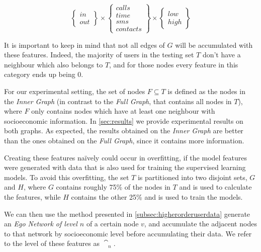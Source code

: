 \begin{equation}
\begin{Bmatrix} in \\ out \end{Bmatrix}
\times
\begin{Bmatrix} calls \\ time \\ sms \\ contacts \end{Bmatrix}
\times
\begin{Bmatrix} low \\ high \end{Bmatrix}
\label{eq:matcatuserdata}
\end{equation}

It is important to keep in mind that not all edges of $G$ will be accumulated with these features. Indeed, the majority of users in the testing set $T$ don't have a neighbour which also belongs to $T$, and for those nodes every feature in this category ends up being $0$.

For our experimental setting, the set of nodes $F \subseteq T$ is defined as the nodes in the \emph{Inner Graph} (in contrast to the \emph{Full Graph}, that contains all nodes in $T$), where $F$ only contains nodes which have at least one neighbour with socioeconomic information. In \cref{sec:results} we provide experimental results on both graphs. As expected, the results obtained on the \emph{Inner Graph} are better than the ones obtained on the \emph{Full Graph}, since it contains more information.

Creating these features naïvely could occur in overfitting, if the model features were generated with data that is also used for training the supervised learning models. To avoid this overfitting, the set $T$ is partitioned into two disjoint sets, $G$ and $H$, where $G$ contains roughly 75\% of the nodes in $T$ and is used to calculate the features, while $H$ contains the other 25\% and is used to train the models.

We can then use the method presented in \cref{subsec:higherorderuserdata} generate an \emph{Ego Network of level $n$} of a certain node $v$, and accumulate the adjacent nodes to that network by socioeconomic level before accumulating their data. We refer to the level of these features as $\cat_n$.
